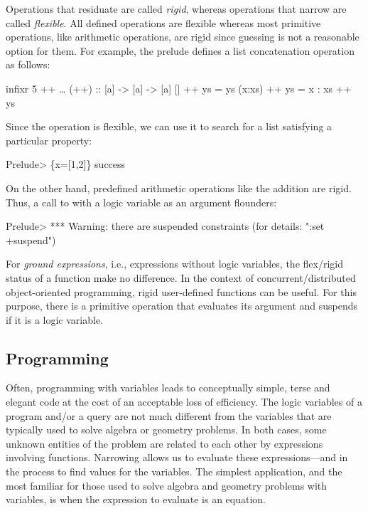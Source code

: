 Operations that residuate are called
\emph{rigid},
whereas operations that narrow are called
\emph{flexible}.
All defined operations are flexible
whereas most primitive operations,
like arithmetic operations, are rigid since guessing is not
a reasonable option for them.
For example, the prelude defines a list concatenation
operation as follows:
%
\begin{prog}
infixr 5 ++
\ldots
(++)          :: [a] -> [a] -> [a]
[]     ++ ys  = ys
(x:xs) ++ ys  = x : xs ++ ys
\end{prog}
%
Since the operation \ccode{++} is flexible, we can use it to search for
a list satisfying a particular property:
%
\begin{prog}
Prelude> 
\{x=[1,2]\} success
\end{prog}
%
On the other hand, predefined arithmetic operations like the addition \ccode{+}
are rigid. Thus, a call to \ccode{+} with a logic variable as an argument
flounders:
%
\begin{prog}
Prelude> 
*** Warning: there are suspended constraints (for details: ":set +suspend")
\end{prog}
%
For \emph{ground expressions},
i.e., expressions without logic variables, the flex/rigid status of
a function make no difference.
In the context of concurrent/distributed object-oriented programming,
rigid user-defined functions can be useful.
For this purpose, there is a primitive operation
that evaluates its argument and suspends if it is a logic variable.


\subsection{Programming}

Often, programming with variables leads
to conceptually simple, terse and elegant code
at the cost of an acceptable loss of efficiency.
The logic variables of a program and/or a query
are not much different from the variables that are typically
used to solve algebra or geometry problems.
In both cases, some unknown entities of the problem
are related to each other by expressions involving functions.
Narrowing allows us to evaluate these expressions---and
in the process to find values for the variables.
The simplest application, and the most familiar for
those used to solve algebra and geometry problems with variables,
is when the expression to evaluate is an equation.

